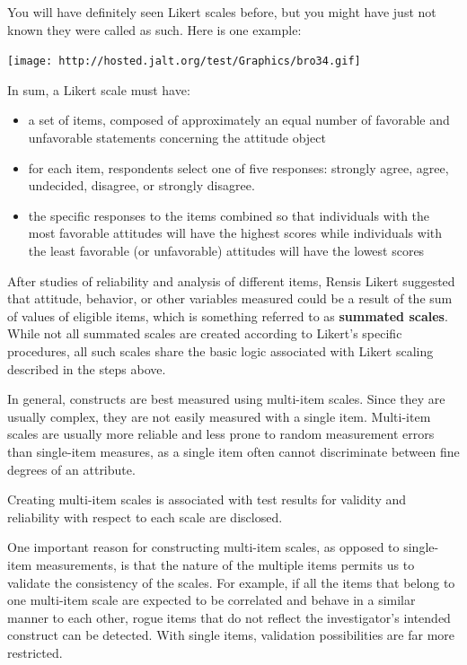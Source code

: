 \documentclass[
]{book}
\providecommand{\tightlist}{%
  \setlength{\itemsep}{0pt}\setlength{\parskip}{0pt}}
\begin{document}
You will have definitely seen Likert scales before, but you might have just not known they were called as such. Here is one example:

\texttt{[image: http://hosted.jalt.org/test/Graphics/bro34.gif]}

In sum, a Likert scale must have:

\begin{itemize}
\tightlist
\item
  a set of items, composed of approximately an equal number of favorable and unfavorable
  statements concerning the attitude object
\item
  for each item, respondents select one of five responses: strongly agree, agree,
  undecided, disagree, or strongly disagree.\\
\item
  the specific responses to the items combined so that individuals with the most favorable attitudes will have the highest scores while individuals with the least favorable (or unfavorable) attitudes will have the lowest scores
\end{itemize}

After studies of reliability and analysis of different items, Rensis Likert suggested that attitude, behavior, or other variables measured could be a result of the sum of values of eligible items, which is something referred to as \textbf{summated scales}. While not all summated scales are created according to Likert's specific procedures, all such scales share the basic logic associated with Likert scaling described in the steps above.

In general, constructs are best measured using multi-item scales. Since they are usually complex, they are not easily measured with a single item. Multi-item scales are usually more reliable and less prone to random measurement errors than single-item measures, as a single item often cannot discriminate between fine degrees of an attribute.

Creating multi-item scales is associated with test results for validity and reliability with respect to each scale are disclosed.

One important reason for constructing multi-item scales, as opposed to single-item measurements, is that the nature of the multiple items permits us to validate the consistency of the scales. For example, if all the items that belong to one multi-item scale are expected to be correlated and behave in a similar manner to each other, rogue items that do not reflect the investigator's intended construct can be detected. With single items, validation possibilities are far more restricted.
\end{document}
